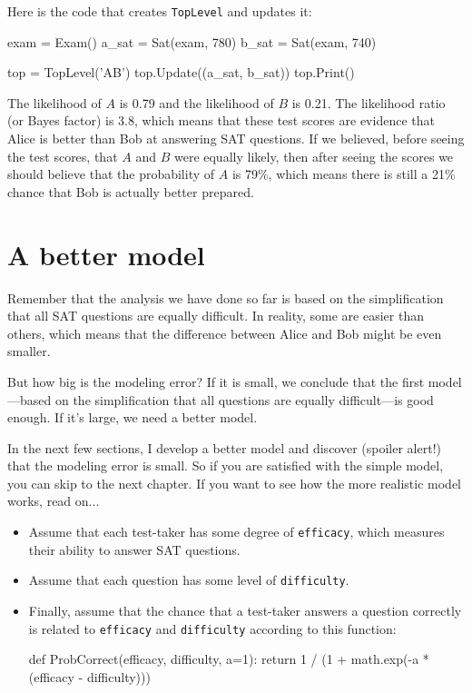 \documentclass[12pt]{book}
\theoremstyle{exercise}
\begin{document}
Here is the code that creates {\tt TopLevel} and updates it:

\begin{code}
    exam = Exam()
    a_sat = Sat(exam, 780)
    b_sat = Sat(exam, 740)

    top = TopLevel('AB')
    top.Update((a_sat, b_sat))
    top.Print()
\end{code}

The likelihood of $A$ is 0.79 and the likelihood of $B$ is 0.21.  The
likelihood ratio (or Bayes factor) is 3.8, which means that these test
scores are evidence that Alice is better than Bob at answering SAT
questions.  If we believed, before seeing the test scores, that $A$
and $B$ were equally likely, then after seeing the scores we should
believe that the probability of $A$ is 79\%, which means there is
still a 21\% chance that Bob is actually better prepared.


\section{A better model}

Remember that the analysis we have done so far is based on
the simplification that all SAT questions are equally difficult.
In reality, some are easier than others, which means that the
difference between Alice and Bob might be even smaller.

But how big is the modeling error?  If it is small, we conclude
that the first model---based on the simplification that all questions
are equally difficult---is good enough.  If it's large,
we need a better model.

In the next few sections, I develop a better model and 
discover (spoiler alert!) that the modeling error is small.  So if
you are satisfied with the simple model, you can skip to the next
chapter.  If you want to see how the more realistic model works,
read on...

\begin{itemize}

\item Assume that each test-taker has some 
  degree of {\tt efficacy}, which measures their
  ability to answer SAT questions.

\item Assume that each question has some level of
  {\tt difficulty}.

\item Finally, assume that the chance that a test-taker answers a
  question correctly is related to {\tt efficacy} and {\tt difficulty}
  according to this function:

\begin{code}
def ProbCorrect(efficacy, difficulty, a=1):
    return 1 / (1 + math.exp(-a * (efficacy - difficulty)))
\end{code}

\end{itemize}
\end{document}
